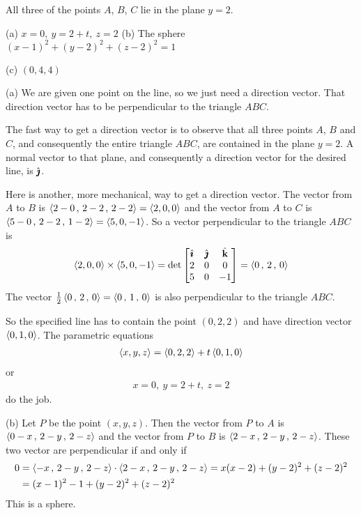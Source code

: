 \begin{hint}
All three of the points $A$, $B$, $C$ lie in the plane $y=2$.
\end{hint}

\begin{answer}
(a) $x=0,\ y=2+t,\ z=2$\qquad
(b) The sphere $(x-1)^2 +(y-2)^2+(z-2)^2 = 1$

(c) $(0,4,4)$
\end{answer}

\begin{solution}
(a) We are given one point on the line, so we just need a
direction vector. That direction vector has to be perpendicular to the 
triangle $ABC$.

The fast way to get a direction vector is to observe that all 
three points $A$, $B$ and $C$, and consequently the entire triangle $ABC$,
are contained in the plane $y=2$. A normal vector to that plane, and 
consequently a direction vector for the desired line, is $\hat{\pmb{\jmath}}$.

Here is another, more mechanical, way to get a direction vector.
The vector from $A$ to $B$ is $\left< 2-0\,,\,2-2\,,\,2-2\right>= \left< 2,0,0\right>$
and the vector from $A$ to $C$ is $\left< 5-0\,,\,2-2\,,\,1-2\right>= 
\left< 5,0,-1\right>$. So a vector perpendicular to the triangle $ABC$ is
\begin{align*}
\left< 2,0,0\right> \times \left< 5,0,-1\right>
=\det\left[\begin{matrix}
            \hat{\pmb{\imath}}  &  \hat{\pmb{\jmath}}  &  \hat{\mathbf{k}} \\
            2    &   0   &    0 \\
            5    &   0   &   -1 
            \end{matrix}\right]
=\left< 0 \,,\, 2 \,,\, 0 \right>
\end{align*}
The vector $\frac{1}{2}\left< 0 \,,\, 2 \,,\, 0 \right>=\left< 0 \,,\, 1 \,,\, 0 \right>$
is also perpendicular to the triangle $ABC$. 

So the specified line has to contain the point $(0,2,2)$ and have direction
vector $\left< 0 , 1 , 0 \right>$. The parametric equations
\begin{align*}
\left< x,y,z \right> = \left< 0 , 2 , 2 \right> + t\left< 0 , 1 , 0 \right>
\end{align*}
or
\begin{align*}
x=0,\ 
y=2+t,\ 
z=2
\end{align*}
do the job.


\goodbreak
(b) Let $P$ be the point $(x,y,z)$. Then the vector from  $P$ to $A$
is $\left< 0-x\,,\,2-y\,,\,2-z\right>$ and the vector from  $P$ to $B$
is $\left< 2-x\,,\,2-y\,,\,2-z\right>$. These two vector are perpendicular
if and only if
\begin{align*}
0 &= \left< -x\,,\,2-y\,,\,2-z\right> \cdot \left< 2-x\,,\,2-y\,,\,2-z\right>
  = x(x-2) +(y-2)^2 +(z-2)^2 \\
  &= (x-1)^2 -1 +(y-2)^2 +(z-2)^2 
\end{align*}
This is a sphere.


\end{solution}
